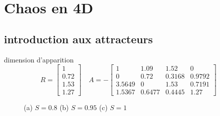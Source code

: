 \documentclass{wsdcr}
\begin{document}
\section{Chaos en 4D}
\subsection{introduction aux attracteurs}
dimension d'apparition
\begin{equation}
R={\begin{bmatrix}1\\0.72\\1.53\\1.27\end{bmatrix}}\quad A =-{\begin{bmatrix}1&1.09&1.52&0\\0&0.72&0.3168&0.9792\\3.5649&0&1.53&0.7191\\1.5367&0.6477&0.4445&1.27\end{bmatrix}}
\end{equation}
\begin{figure}
    \centering
    \caption{(a) $S=0.8$ (b) $S=0.95$ (c) $S=1$}
    \label{fig:subbif}
\end{figure}
\end{document}
